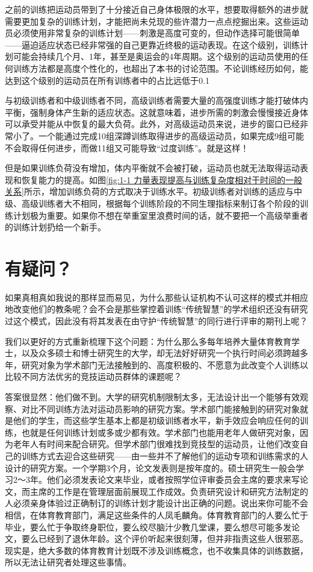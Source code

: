 之前的训练把运动员带到了十分接近自己身体极限的水平，想要取得额外的进步就需要更加复杂的训练计划，才能把尚未兑现的些许潜力一点点挖掘出来。这些运动员必须使用非常复杂的训练计划——刺激是高度可变的，但动作选择可能很简单——逼迫适应状态已经非常强的自己更靠近终极的运动表现。在这个级别，训练计划可能会持续几个月、1年，甚至是奥运会的4年周期。这个级别的运动员使用的任何训练方法都是高度个性化的，也超出了本书的讨论范围。不论训练经历如何，能达到这个级别的运动员在所有训练者中的占比远低于0.1%

与初级训练者和中级训练者不同，高级训练者需要大量的高强度训练才能打破体内平衡，强制身体产生新的适应状态。这就意味着，进步所需的刺激会慢慢接近身体可以承受并能从中恢复的最大负荷。此外，对高级运动员来说，进步的窗口已经非常小了。一个能通过完成10组深蹲训练取得进步的高级运动员，如果完成9组可能不会取得任何进步，而做11组又可能导致“过度训练”。就是这样！

但是如果训练负荷没有增加，体内平衡就不会被打破，运动员也就无法取得运动表现和恢复能力的提高。如图\ref{fig:1-1 力量表现提高与训练复杂度相对于时间的一般关系}所示，增加训练负荷的方式取决于训练水平。初级训练者对训练的适应与中级、高级训练者大不相同，根据每个训练阶段的不同生理指标来制订各个阶段的训练计划极为重要。如果你不想在举重室里浪费时间的话，就不要把一个高级举重者的训练计划扔给一个新手。

\section{有疑问？}

如果真相真如我说的那样显而易见，为什么那些认证机构不认可这样的模式并相应地改变他们的教条呢？会不会是那些掌控着训练“传统智慧”的学术组织还没有研究过这个模式，因此没有将其发表在由守护“传统智慧”的同行进行评审的期刊上呢？

我们以更好的方式重新梳理下这个问题：为什么那么多每年培养大量体育教育学士，以及众多硕士和博士研究生的大学，却无法好好研究一个执行时间必须跨越多年，研究对象为学术部门无法接触到的、高度积极的、不愿意为此改变个人训练以比较不同方法优劣的竞技运动员群体的课题呢？

答案很显然：他们做不到。大学的研究机制限制太多，无法设计出一个能够有效观察、对比不同训练方法对运动员影响的研究方案。学术部门能接触到的研究对象就是他们的学生，而这些学生基本上都是初级训练者水平，新手效应会响应任何的训练，也就是任何训练计划或多或少都有效。学术部门也能用老年人做研究对象，因为老年人有时间来配合研究。但学术部门很难找到竞技型的运动员，让他们改变自己的训练方式去迎合这些研究——由一些并不了解他们的运动专项和训练需求的人设计的研究方案。一个学期3个月，论文发表则是按年度的。硕士研究生一般会学习2～3年。他们必须发表论文来毕业，或者按照学位评审委员会主席的要求来写论文，而主席的工作是在管理层面前展现工作成效。负责研究设计和研究方法制定的人必须亲身体验过正确制订的训练计划才能设计出正确的问题。说出来你可能不会相信，在体育教育部门，满足这些条件的人凤毛麟角。体育教育部门的人要么忙于毕业，要么忙于争取终身职位，要么绞尽脑汁少教几堂课，要么想尽可能多发论文，要么已经到了退休年龄。这个评价听起来很刻薄，但并非指责这些人很邪恶。现实是，绝大多数的体育教育计划既不涉及训练概念，也不收集具体的训练数据，所以无法让研究者处理这些事情。


